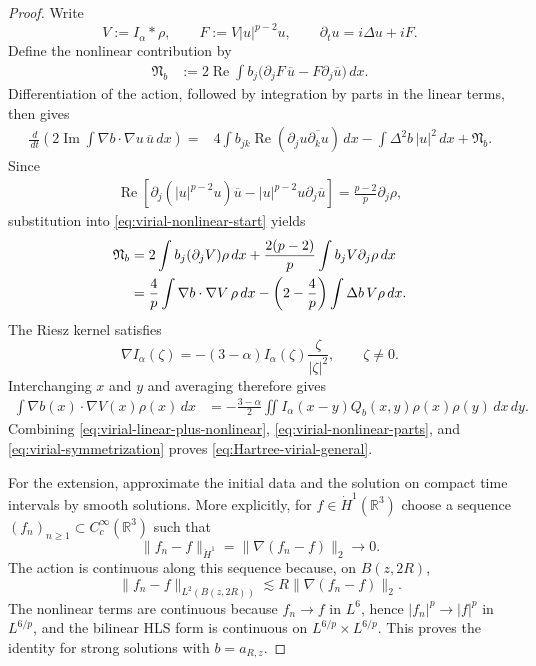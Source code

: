 \documentclass[preprint,12pt]{elsarticle}
\numberwithin{equation}{section}
\theoremstyle{remark}
\newcommand{\R}{\mathbb R}
\newcommand{\dd}{\,d}
\begin{document}
\begin{proof}
Write
\[
  V:=I_\alpha*\rho,
  \qquad F:=V|u|^{p-2}u,
  \qquad \partial_tu=i\Delta u+iF.
\]
Define the nonlinear contribution by
\begin{align}
  \mathfrak N_b
  &:=2\operatorname{Re}\int b_j
  \bigl(\partial_jF\,\overline u-F\partial_j\overline u\bigr)\dd x.
  \label{eq:virial-nonlinear-start}
\end{align}
Differentiation of the action, followed by integration by parts in the linear terms, then gives
\begin{align}
 \frac{\dd}{\dd t}
 \left(2\operatorname{Im}\int\nabla b\cdot\nabla u\,\overline u\dd x\right)
 ={}&4\int b_{jk}\operatorname{Re}(\partial_ju\overline{\partial_ku})\dd x
 -\int\Delta^2b\,|u|^2\dd x
 +\mathfrak N_b.
 \label{eq:virial-linear-plus-nonlinear}
\end{align}
Since
\begin{align*}
  \operatorname{Re}\!\left[
  \partial_j(|u|^{p-2}u)\overline u
  -|u|^{p-2}u\partial_j\overline u
  \right]
  =\frac{p-2}{p}\partial_j\rho,
\end{align*}
substitution into \eqref{eq:virial-nonlinear-start} yields
\begin{align}
  \mathfrak N_b
  &=2\int b_j(\partial_jV)\rho\dd x
  +\frac{2(p-2)}p\int b_jV\partial_j\rho\dd x\notag\\
  &=\frac4p\int\nabla b\cdot\nabla V\,\rho\dd x
  -\left(2-\frac4p\right)\int\Delta b\,V\rho\dd x.
  \label{eq:virial-nonlinear-parts}
\end{align}
The Riesz kernel satisfies
\[
  \nabla I_\alpha(\zeta)
  =-(3-\alpha)I_\alpha(\zeta)\frac{\zeta}{|\zeta|^2},
  \qquad \zeta\ne0.
\]
Interchanging $x$ and $y$ and averaging therefore gives
\begin{align}
  \int\nabla b(x)\cdot\nabla V(x)\rho(x)\dd x
  &=-\frac{3-\alpha}{2}
  \iint I_\alpha(x-y)Q_b(x,y)\rho(x)\rho(y)\dd x\dd y.
  \label{eq:virial-symmetrization}
\end{align}
Combining \eqref{eq:virial-linear-plus-nonlinear}, \eqref{eq:virial-nonlinear-parts}, and \eqref{eq:virial-symmetrization} proves \eqref{eq:Hartree-virial-general}.

For the extension, approximate the initial data and the solution on compact time intervals by smooth solutions. More explicitly, for $f\in\dot H^1(\R^3)$ choose a sequence $(f_n)_{n\ge1}\subset C_c^\infty(\R^3)$ such that
\[
  \|f_n-f\|_{\dot H^1}=\|\nabla(f_n-f)\|_2\longrightarrow0.
\]
The action is continuous along this sequence because, on $B(z,2R)$,
\[
  \|f_n-f\|_{L^2(B(z,2R))}
  \lesssim R\|\nabla(f_n-f)\|_2.
\]
The nonlinear terms are continuous because $f_n\to f$ in $L^6$, hence $|f_n|^p\to|f|^p$ in $L^{6/p}$, and the bilinear HLS form is continuous on $L^{6/p}\times L^{6/p}$. This proves the identity for strong solutions with $b=a_{R,z}$.
\end{proof}
\end{document}
